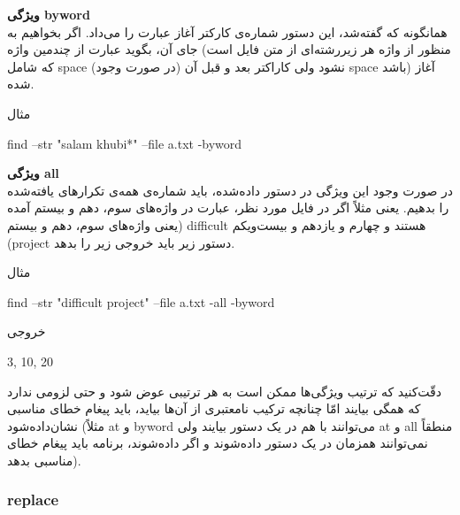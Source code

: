 \documentclass[]{article}
\begin{document}
\textbf{ویژگی byword}\\

همانگونه که گفته‌شد، این دستور شماره‌ی کارکتر آغاز عبارت را می‌داد. اگر بخواهیم به جای آن، بگوید عبارت از چندمین واژه (منظور از واژه هر زیررشته‌ای از متن فایل است که شامل space نشود ولی کاراکتر بعد و قبل آن (در صورت وجود) space باشد) آغاز شده.\\

\begin{mybox}[colback=yellow]{مثال}
	\begin{latin}	
		find --str "salam khubi*" --file a.txt -byword
	\end{latin}
\end{mybox}
\newpage
\textbf{ویژگی all}\\

در صورت وجود این ویژگی در دستور داده‌شده، باید شماره‌ی همه‌ی تکرارهای یافته‌شده را بدهیم. یعنی مثلاً اگر در فایل مورد نظر، عبارت  در واژه‌های سوم، دهم و بیستم آمده (یعنی واژه‌های سوم، دهم و بیستم difficult هستند و چهارم و یازدهم و بیست‌ویکم (project دستور زیر باید خروجی زیر را بدهد.\\


\begin{mybox}[colback=yellow]{مثال}
	\begin{latin}	
		find --str "difficult project" --file a.txt -all -byword
	\end{latin}
\end{mybox}


\begin{mybox}[colback=yellow]{خروجی}
	\begin{latin}	
		3, 10, 20
	\end{latin}
\end{mybox}

دقّت‌کنید که ترتیب ویژگی‌ها ممکن است به هر ترتیبی عوض شود و حتی لزومی ندارد که همگی بیایند امّا چنانچه ترکیب نامعتبری از آن‌ها بیاید، باید پیغام خطای مناسبی نشان‌داده‌شود (مثلاً at و byword می‌توانند با هم در یک دستور بیایند ولی at و all منطقاً نمی‌توانند همزمان در یک دستور داده‌شوند و اگر داده‌شوند،‌ برنامه باید پیغام خطای مناسبی بدهد).







\subsubsection*{{\titr replace}}
\end{document}
